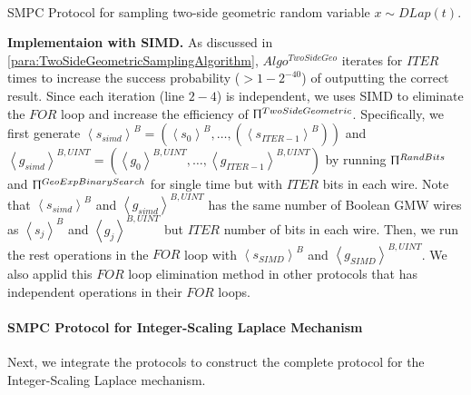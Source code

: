 \begin{protocol}[tbh!]
{{                        \\
                  }}
            \caption{SMPC Protocol for sampling two-side geometric random variable $x\sim DLap\left(t\right) $.}
            \label{prot:TwoSideGeometric}
      \end{protocol}
      \FloatBarrier

      \textbf{Implementaion with SIMD.}
      As discussed in \autoref{para:TwoSideGeometricSamplingAlgorithm}, $Algo^{TwoSideGeo}$ iterates for $ITER$ times to increase the success probability ($>1-2^{-40}$) of outputting the correct result. Since each iteration (line $2-4$) is independent, we uses SIMD to eliminate the $FOR$ loop and increase the efficiency of $\Uppi^{TwoSideGeometric}$. Specifically, we first generate $\left\langle s_{simd}\right\rangle^{B} =\left(\left\langle s_0\right\rangle ^B,\ldots, \left(\left\langle s_{ITER-1}\right\rangle ^B \right) \right) $ and $\left\langle g_{simd}\right\rangle^{B,UINT} =\left(\left\langle {g_0}\right\rangle ^{B,UINT} , \ldots, \left\langle {g_{ITER-1}}\right\rangle ^{B,UINT}\right) $ by running $\Uppi^{RandBits}$ and $\Uppi^{GeoExpBinarySearch}$ for single time but with $ITER$ bits in each wire. Note that $\left\langle s_{simd}\right\rangle^{B}$ and $\left\langle g_{simd}\right\rangle^{B,UINT} $ has the same number of Boolean GMW wires as $\left\langle s_{j}\right\rangle ^B$ and $\left\langle {g_j}\right\rangle ^{B,UINT} $ but $ITER$ number of bits in each wire. Then, we run the rest operations in the $FOR$ loop with $\left\langle s_{SIMD}\right\rangle^{B}$ and $\left\langle g_{SIMD}\right\rangle^{B,UINT} $. We also applid this $FOR$ loop elimination method in other \smpc protocols that has independent operations in their $FOR$ loops.


      \paragraph{SMPC Protocol for Integer-Scaling Laplace Mechanism}
      \label{para:MPCProtocolforInteger-scalingLaplaceMechanism}

      Next, we integrate the protocols to construct the complete \smpc protocol for the Integer-Scaling Laplace mechanism.

